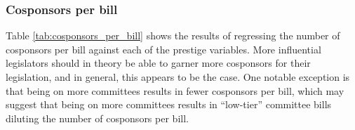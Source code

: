 \documentclass{article}
\begin{document}
\subsubsection{Cosponsors per bill}
\label{result:cosponsors_per_bill}
Table \ref{tab:cosponsors_per_bill} shows the results of regressing the number of cosponsors per bill against each of the prestige variables. More influential legislators should in theory be able to garner more cosponsors for their legislation, and in general, this appears to be the case. One notable exception is that being on more committees results in fewer cosponsors per bill, which may suggest that being on more committees results in ``low-tier'' committee bills diluting the number of cosponsors per bill.
\begin{table}[!htbp]
    \noindent
    \caption{Cosponsors per bill} 
    \label{tab:cosponsors_per_bill} 
\end{table}
\end{document}
